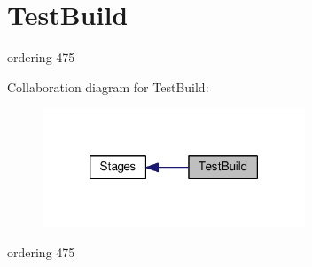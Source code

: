 \hypertarget{group__TestBuild}{\section{Test\-Build}
\label{group__TestBuild}
}


ordering 475  


Collaboration diagram for Test\-Build\-:
\nopagebreak
\begin{figure}[H]
\begin{center}
\leavevmode
\includegraphics[width=222pt]{group__TestBuild}
\end{center}
\end{figure}
ordering 475 